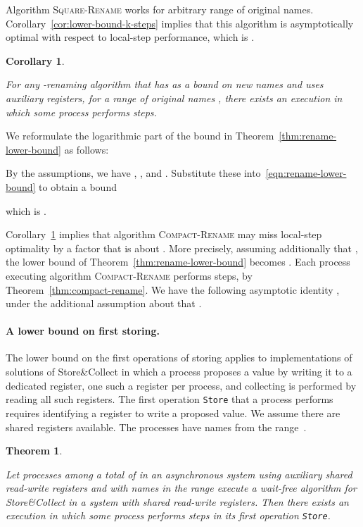 \documentclass[11pt]{article}
\newcommand{\BBB}{\vspace*{-\bigskipamount}}
\newcommand{\Paragraph}[1]{\BBB\paragraph{#1}}
\newcommand{\qed}{\hfill  \smallbreak}
\newenvironment{proof}{\noindent{\bf Proof:}}{\qed}
\newtheorem{theorem}{Theorem}
\newtheorem{corollary}{Corollary}
\begin{document}
Algorithm \textsc{Square-Rename} works for arbitrary range  of  original names.
Corollary~\ref{cor:lower-bound-k-steps} implies that this algorithm is asymptotically optimal with respect to local-step performance, which is .



\begin{corollary}
\label{cor:lower-bound-k-N-renaming}

For any -renaming algorithm that has  as a bound on new names and uses  auxiliary registers, for a range of original names , there exists an execution in which some process performs  steps.
\end{corollary}

\begin{proof}
We reformulate the logarithmic part of the bound in Theorem~\ref{thm:rename-lower-bound} as follows:

By the assumptions, we have , ,  and .
Substitute these into~\eqref{eqn:rename-lower-bound} to obtain a bound

which is .
\end{proof}

Corollary~\ref{cor:lower-bound-k-N-renaming} implies that algorithm \textsc{Compact-Rename} may miss local-step optimality by a factor that is about .
More precisely, assuming additionally that , the lower bound of Theorem~\ref{thm:rename-lower-bound} becomes . Each process executing algorithm \textsc{Compact-Rename}  performs   steps, by Theorem~\ref{thm:compact-rename}. 
We have the following asymptotic  identity , under the additional assumption about  that .




\Paragraph{A lower bound on first storing.}


The lower bound on the first operations of storing applies to implementations of solutions of Store\&Collect in which a process proposes a value by writing it to a dedicated register, one such a register per process, and collecting is performed by reading all such registers.
The first operation \texttt{Store} that a process performs requires identifying a register to write a proposed value. 
We assume there are  shared registers available.
The processes have names from the range~.




\begin{theorem}
\label{thm:store-collect-lower-bound}

Let  processes among a total of  in an asynchronous system using  auxiliary shared read-write registers and with names in the range  execute a wait-free algorithm for Store\&Collect in a system with  shared read-write registers. 
Then there exists an execution in which some process performs  steps in its first operation \texttt{Store}.
\end{theorem}
\end{document}
